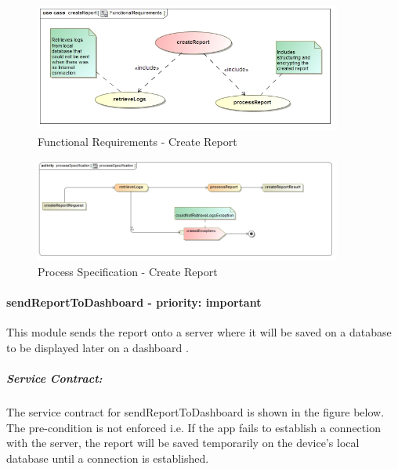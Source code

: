 \documentclass[hidelinks, 12pt, oneside]{article}
\begin{document}
		
		\begin{figure}[!htbp]
    		\centering
    		\includegraphics[width=0.9\textwidth]{img/FunctionalRequirementscreateReport.jpg}
    		\caption{Functional Requirements - Create Report}
    		\label{fig:FunctionalReq_createReport}
		\end{figure}
		
		
		\begin{figure}[!htbp]
    		\centering
    		\includegraphics[width=0.9\textwidth]{img/processSpecificationcreateReport.jpg}
    		\caption{Process Specification - Create Report}
    		\label{fig:ProcessSpec_createReport}
		\end{figure}
		\newpage			
					
								
		\paragraph{ sendReportToDashboard - priority: important}
		This module sends the report onto a server where it will be saved on a database to be displayed later on a dashboard .\newline
		\subparagraph{Service Contract:}
			The service contract for sendReportToDashboard is shown in the figure below. The pre-condition is not enforced i.e. If the app fails to establish a connection with the server, the report will be saved temporarily on the device's local database until a connection is established.
			
\end{document}
